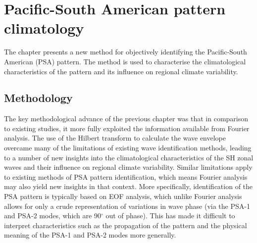 
\chapter{Pacific-South American pattern climatology}\label{c:psa_climatology}


\begin{synopsis}
The chapter presents a new method for objectively identifying the Pacific-South American (PSA) pattern. The method is used to characterise the climatological characteristics of the pattern and its influence on regional climate variability.
\end{synopsis}


\section{Methodology}

The key methodological advance of the previous chapter was that in comparison to existing studies, it more fully exploited the information available from Fourier analysis. The use of the Hilbert transform to calculate the wave envelope overcame many of the limitations of existing wave identification methods, leading to a number of new insights into the climatological characteristics of the SH zonal waves and their influence on regional climate variability. Similar limitations apply to existing methods of PSA pattern identification, which means Fourier analysis may also yield new insights in that context. More specifically, identification of the PSA pattern is typically based on EOF analysis, which unlike Fourier analysis allows for only a crude representation of variations in wave phase (via the PSA-1 and PSA-2 modes, which are 90$^{\circ}$ out of phase). This has made it difficult to interpret characteristics such as the propagation of the pattern and the physical meaning of the PSA-1 and PSA-2 modes more generally. 

